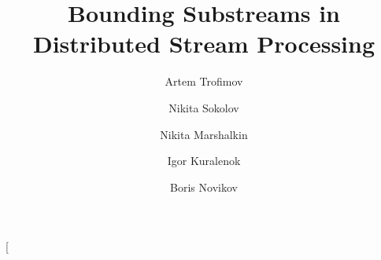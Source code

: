 \documentclass[review,%
10pt,twocolumn%
]{elsarticle}
\begin{document}
\twocolumn[{
\begin{frontmatter}

\title {Bounding Substreams in Distributed Stream Processing}

\author[1]{Artem Trofimov}
\author[2]{Nikita Sokolov}
\author[3]{Nikita Marshalkin}
\author[4]{Igor Kuralenok}
\author[5]{Boris Novikov}

\address[1]{lzy.ai, Tel Aviv, Israel}
\address[2]{Yandex Cloud, Saint Petersburg, Russia}
\address[3]{No affiliation, Limassol, Cyprus}
\address[4]{Huawei, Saint Petersburg, Russia}
\address[5]{HSE University, Saint Petersburg, Russia}









\end{frontmatter}}
\end{document}
